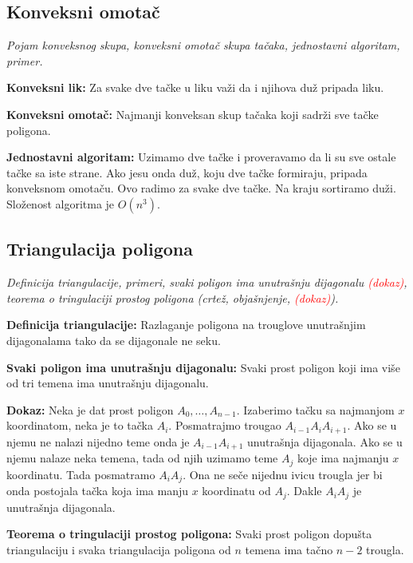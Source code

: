 \documentclass[12pt]{article}
\newcommand{\ocena}[1]{\textcolor{red}{#1}}
\begin{document}
\subsection{Konveksni omotač}
\textit{Pojam konveksnog skupa, konveksni omotač skupa tačaka, jednostavni
    algoritam, primer.}
\par
\vspace*{1cm}

\textbf{Konveksni lik:} Za svake dve tačke u liku važi da i njihova duž pripada
liku.
\par

\textbf{Konveksni omotač:} Najmanji konveksan skup tačaka koji sadrži sve
tačke poligona.
\par

\textbf{Jednostavni algoritam:} Uzimamo dve tačke i proveravamo da li su sve
ostale tačke sa iste strane. Ako jesu onda duž, koju dve tačke formiraju,
pripada konveksnom omotaču. Ovo radimo za svake dve tačke. Na kraju sortiramo
duži. Složenost algoritma je $O(n^3)$.

\subsection{Triangulacija poligona}
\textit{Definicija triangulacije, primeri, svaki poligon ima unutrašnju
    dijagonalu \ocena{(dokaz)}, teorema o tringulaciji prostog poligona (crtež,
    objašnjenje, \ocena{(dokaz)}).}
\par
\vspace*{1cm}

\textbf{Definicija triangulacije:} Razlaganje poligona na trouglove
unutrašnjim dijagonalama tako da se dijagonale ne seku.
\par

\textbf{Svaki poligon ima unutrašnju dijagonalu:} Svaki prost poligon koji ima
više od tri temena ima unutrašnju dijagonalu.
\par
\textbf{Dokaz:} Neka je dat prost poligon $A_0,\dotsc,A_{n-1}$. Izaberimo tačku
sa najmanjom $x$ koordinatom, neka je to tačka $A_i$. Posmatrajmo trougao
$A_{i-1}A_iA_{i+1}$. Ako se u njemu ne nalazi nijedno teme onda je
$A_{i-1}A_{i+1}$ unutrašnja dijagonala. Ako se u njemu nalaze neka temena, tada
od njih uzimamo teme $A_j$ koje ima najmanju $x$ koordinatu. Tada posmatramo
$A_iA_j$. Ona ne seče nijednu ivicu trougla jer bi onda postojala tačka koja
ima manju $x$ koordinatu od $A_j$. Dakle $A_iA_j$ je unutrašnja dijagonala.

\textbf{Teorema o tringulaciji prostog poligona:} Svaki prost poligon dopušta
triangulaciju i svaka triangulacija poligona od $n$ temena ima tačno $n-2$
trougla.
\par
\end{document}
